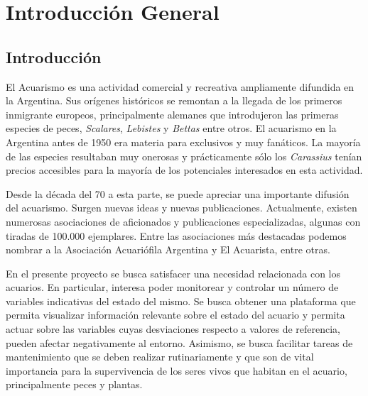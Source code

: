 
\chapter{Introducción General} %

\label{Chapter1} %
\label{IntroGeneral}


\newcommand{\keyword}[1]{\textbf{#1}}
\newcommand{\tabhead}[1]{\textbf{#1}}
\newcommand{\code}[1]{\texttt{#1}}
\newcommand{\file}[1]{\texttt{\bfseries#1}}
\newcommand{\option}[1]{\texttt{\itshape#1}}


\section{Introducción}

El Acuarismo es una actividad comercial y recreativa ampliamente difundida en la Argentina.  Sus orígenes históricos se remontan a la llegada de los primeros inmigrante europeos, principalmente alemanes que introdujeron las primeras especies de peces, \textit{Scalares}, \textit{Lebistes} y \textit{Bettas} entre otros.
El acuarismo en la Argentina antes de 1950 era materia para exclusivos y muy fanáticos. La mayoría de las especies resultaban muy onerosas y prácticamente sólo los \textit{Carassius} tenían precios accesibles para la mayoría de los potenciales interesados en esta actividad.

Desde la década del 70 a esta parte, se puede apreciar una importante difusión del acuarismo. Surgen nuevas ideas y nuevas publicaciones.  Actualmente, existen numerosas asociaciones de aficionados y publicaciones especializadas, algunas con tiradas de 100.000 ejemplares.  Entre las asociaciones más destacadas podemos nombrar a la Asociación Acuariófila Argentina y El Acuarista, entre otras.

En el presente proyecto se busca satisfacer una necesidad relacionada con los acuarios. En particular, interesa poder monitorear y controlar un número de variables indicativas del estado del mismo.  Se busca obtener una plataforma que permita visualizar información relevante sobre el estado del acuario y permita actuar sobre las variables cuyas desviaciones respecto a valores de referencia, pueden afectar negativamente al entorno.  Asimismo, se busca facilitar tareas de mantenimiento que se deben realizar rutinariamente y que son de vital importancia para la supervivencia de los seres vivos que habitan en el acuario, principalmente peces y plantas.

